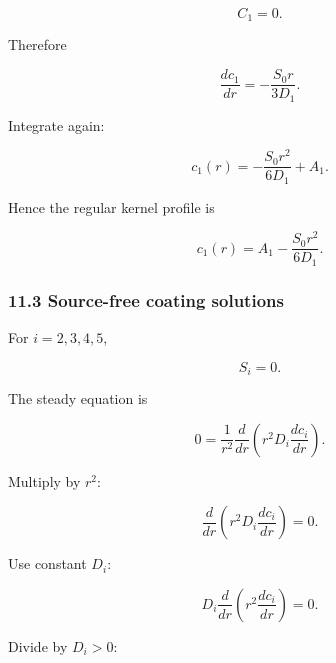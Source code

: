 \documentclass[11pt,a4paper]{article}
\begin{document}
\begin{equation}
C_1=0.
\tag{TRISO-ML-319}
\label{eq:triso-ml-319}
\end{equation}

Therefore

\begin{equation}
\frac{dc_1}{dr}
=
-\frac{S_0r}{3D_1}.
\tag{TRISO-ML-320}
\label{eq:triso-ml-320}
\end{equation}

Integrate again:

\begin{equation}
c_1(r)
=
-\frac{S_0r^2}{6D_1}
+A_1.
\tag{TRISO-ML-321}
\label{eq:triso-ml-321}
\end{equation}

Hence the regular kernel profile is

\begin{equation}
\boxed{
c_1(r)
=
A_1-\frac{S_0r^2}{6D_1}.
}
\tag{TRISO-ML-322}
\label{eq:triso-ml-322}
\end{equation}

\subsubsection*{11.3 Source-free coating solutions}

For $i=2,3,4,5$,

\begin{equation}
S_i=0.
\tag{TRISO-ML-323}
\label{eq:triso-ml-323}
\end{equation}

The steady equation is

\begin{equation}
0=
\frac1{r^2}
\frac{d}{dr}
\left(
r^2D_i\frac{dc_i}{dr}
\right).
\tag{TRISO-ML-324}
\label{eq:triso-ml-324}
\end{equation}

Multiply by $r^2$:

\begin{equation}
\frac{d}{dr}
\left(
r^2D_i\frac{dc_i}{dr}
\right)=0.
\tag{TRISO-ML-325}
\label{eq:triso-ml-325}
\end{equation}

Use constant $D_i$:

\begin{equation}
D_i
\frac{d}{dr}
\left(
r^2\frac{dc_i}{dr}
\right)=0.
\tag{TRISO-ML-326}
\label{eq:triso-ml-326}
\end{equation}

Divide by $D_i>0$:
\end{document}
